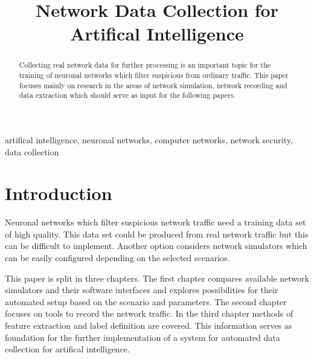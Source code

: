 \documentclass[conference]{IEEEtran}
\begin{document}
\title{Network Data Collection for Artifical Intelligence
}

\author{
\and
{}
\and
{}
}

\maketitle

\begin{abstract}
Collecting real network data for further processing is an important topic for the training of neuronal networks which filter suspicious from ordinary traffic. This paper focuses mainly on research in the areas of network simulation, network recording and data extraction which should serve as input for the following papers.
\end{abstract}

\begin{IEEEkeywords}
artifical intelligence, neuronal networks, computer networks, network security, data collection
\end{IEEEkeywords}

\section{Introduction}
Neuronal networks which filter suspicious network traffic need a training data set of high quality. This data set could be produced from real network traffic but this can be difficult to implement. Another option considers network simulators which can be easily configured depending on the selected scenarios.

This paper is split in three chapters. The first chapter compares available network simulators and their software interfaces and explores possibilities for their automated setup based on the scenario and parameters. The second chapter focuses on tools to record the network traffic. In the third chapter methods of feature extraction and label definition are covered. This information serves as foundation for the further implementation of a system for automated data collection for artifical intelligence.
\end{document}
